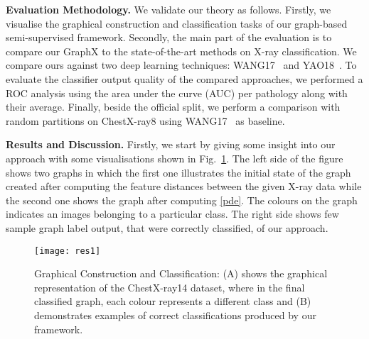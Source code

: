 \documentclass[runningheads]{llncs}
\begin{document}
\medskip
\noindent
\textbf{Evaluation Methodology.} We validate our theory as follows. Firstly, we visualise the graphical construction and classification tasks of our graph-based semi-supervised framework. Secondly, the main part of the evaluation is to compare our GraphX  to the state-of-the-art  methods on X-ray classification. We compare ours against two deep learning techniques: WANG17~\cite{wang2017chestx} and YAO18~\cite{yao2018weakly}. To evaluate the classifier output quality of the compared approaches, we performed a ROC analysis using the area under the curve (AUC) per pathology along with their average. Finally, beside the official split, we perform a comparison with random partitions on ChestX-ray8 using WANG17~\cite{wang2017chestx} as baseline.

\medskip
\noindent
\textbf{Results and Discussion.} Firstly, we start by giving some insight into our approach with some visualisations shown in Fig.~\ref{fig::res2}. The left side of the figure shows two graphs in which the first one illustrates the initial state of the graph created after computing the feature distances between the given X-ray data while the second one shows the graph after computing \eqref{pde}. The colours on the graph indicates an images belonging to a particular class. The right side shows few sample graph label output, that were correctly classified, of our approach.


\begin{figure}[t!]
\centering
\texttt{[image: res1]}
\caption{Graphical Construction and Classification: (A) shows the graphical representation of the ChestX-ray14 dataset, where in the final classified graph, each colour represents a different class and (B) demonstrates examples of correct classifications produced by our framework.}
\label{fig::res2}
\end{figure}
\end{document}
